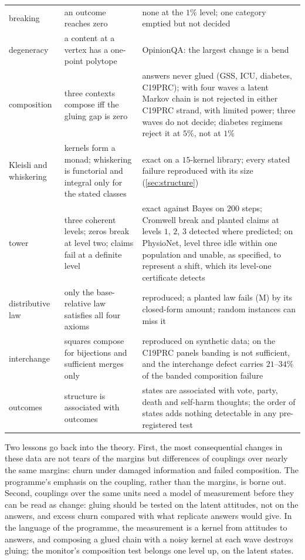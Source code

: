 \documentclass[11pt]{article}
\theoremstyle{definition}
\theoremstyle{remark}
\begin{document}
{\begin{longtable}{p{2.3cm}p{6.2cm}p{6.4cm}}
breaking & an outcome reaches zero & none at the $1\%$ level; one category emptied but not decided\\
degeneracy & a content at a vertex has a one-point polytope & OpinionQA: the largest change is a bend\\
composition & three contexts compose iff the gluing gap is zero & answers never glued (GSS, ICU, diabetes, C19PRC); with four waves a latent Markov chain is not rejected in either C19PRC strand, with limited power; three waves do not decide; diabetes regimens reject it at $5\%$, not at $1\%$\\
Kleisli and whiskering & kernels form a monad; whiskering is functorial and integral only for the stated classes & exact on a $15$-kernel library; every stated failure reproduced with its size (\cref{sec:structure})\\
tower & three coherent levels; zeros break at level two; claims fail at a definite level & exact against Bayes on $200$ steps; Cromwell break and planted claims at levels $1$, $2$, $3$ detected where predicted; on PhysioNet, level three idle within one population and unable, as specified, to represent a shift, which its level-one certificate detects\\
distributive law & only the base-relative law satisfies all four axioms & reproduced; a planted law fails (M) by its closed-form amount; random instances can miss it\\
interchange & squares compose for bijections and sufficient merges only & reproduced on synthetic data; on the C19PRC panels banding is not sufficient, and the interchange defect carries $21$--$34\%$ of the banded composition failure\\
outcomes & structure is associated with outcomes & states are associated with vote, party, death and self-harm thoughts; the order of states adds nothing detectable in any pre-registered test\\
\end{longtable}}

Two lessons go back into the theory. First, the most consequential changes in these data are not tears of the margins but differences of
couplings over nearly the same margins: churn under damaged information and failed composition. The programme's emphasis on the
coupling, rather than the margins, is borne out. Second, couplings over the same units need a model of measurement before they can be read
as change: gluing should be tested on the latent attitudes, not on the answers, and excess churn compared with what replicate answers
would give. In the language of the programme, the measurement is a kernel from attitudes to answers, and composing a glued chain with a
noisy kernel at each wave destroys gluing; the monitor's composition test belongs one level up, on the latent states.
\end{document}
